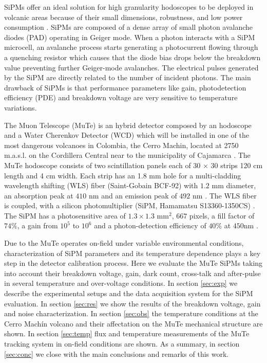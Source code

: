 \documentclass[a4paper,11pt]{article}
\begin{document}
SiPMs offer an ideal solution for high granularity hodoscopes to be deployed in volcanic areas because of their small dimensions, robustness, and low power consumption \cite{Ambrosino2014}. SiPMs are composed of a dense array of small photon avalanche diodes (PAD) operating in Geiger mode. When a photon interacts with a SiPM microcell, an avalanche process starts generating a photocurrent flowing through a quenching resistor which causes that the diode bias drops below the breakdown value preventing further Geiger-mode avalanches. The electrical pulses generated by the SiPM are directly related to the number of incident photons. The main drawback of SiPMs is that performance parameters like gain, photodetection efficiency (PDE) and breakdown voltage are very sensitive to temperature variations.

The Muon Telescope (MuTe) is an hybrid detector composed by an hodoscope and a Water Cherenkov Detector (WCD) which will be installed in one of the most dangerous volcanoes in Colombia, the Cerro Machin, located at 2750 m.a.s.l. on the Cordillera Central near to the municipality of Cajamarca \cite{AsoreyEtal2017B}. The MuTe hodoscope consists of two scintillation panels each of 30 $\times$ 30 strips 120 cm length and 4 cm width. Each strip has an 1.8 mm hole for a multi-cladding wavelength shifting (WLS) fiber (Saint-Gobain BCF-92)  with $1.2$ mm diameter, an absorption peak at $410$ nm and an emission peak of $492$ nm \cite{SaintGobain2018}. The WLS fiber is coupled, with a silicon photomultiplier (SiPM, Hamamatsu S13360-1350CS) \cite{Hamamatsu2018}. The SiPM has a photosensitive area of $1.3 \times 1.3 \textrm{ mm}^2$, $667$ pixels, a fill factor of $74\%$, a gain from $10^5$ to $10^6$ and a photon-detection efficiency of $40 \%$ at $450 \textrm{nm}$ \cite{pena2019calibration, PenaRodriguezEtal2018}.

Due to the MuTe operates on-field under variable environmental conditions, characterization of SiPM parameters and its temperature dependence plays a key step in the detector calibration process. Here we evaluate the MuTe SiPMs taking into account their breakdown voltage, gain, dark count, cross-talk and after-pulse in several temperature and over-voltage conditions. In section \ref{sec:exp} we describe the experimental setups and the data acquisition system for the SiPM evaluation. In section \ref{sec:res} we show the results of the breakdown voltage, gain and noise characterization. In section \ref{sec:obs} the temperature conditions at the Cerro Mach\'in volcano and their affectation on the MuTe mechanical structure are shown. In section \ref{sec:temp} flux and temperature measurements of the MuTe tracking system in on-field conditions are shown. As a summary, in section \ref{sec:conc} we close with the main conclusions and remarks of this work.
\end{document}
